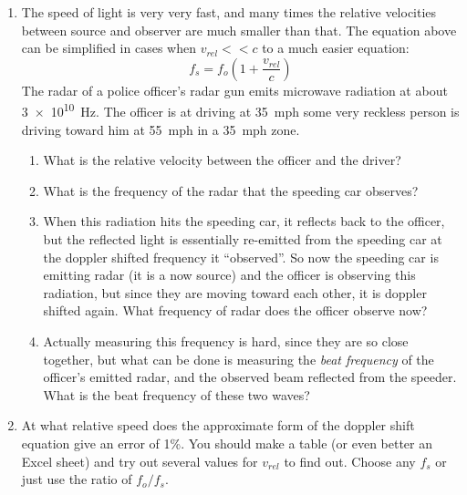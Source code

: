 \begin{enumerate}
\item
The speed of light is very very fast, and many times the relative velocities between source and observer are much smaller than that. The equation above can be simplified in cases when $v_{rel}<<c$ to a much easier equation: 
\[f_s = f_o\left(1+\frac{v_{rel}}{c}\right)\]
The radar of a police officer's radar gun emits microwave radiation at about \SI{3e10}{\hertz}. The officer is at driving at \SI{35}{mph} some very reckless person is driving toward him at \SI{55}{mph} in a \SI{35}{mph} zone. 
\begin{enumerate}
	\setlength\itemsep{2 in}
	\item What is the relative velocity between the officer and the driver?
	\item What is the frequency of the radar that the speeding car observes?
	\item When this radiation hits the speeding car, it reflects back to the officer, but the reflected light is essentially re-emitted from the speeding car at the doppler shifted frequency it ``observed''. So now the speeding car is emitting radar (it is a now source) and the officer is observing this radiation, but since they are moving toward each other, it is doppler shifted again. What frequency of radar does the officer observe now?
	\item Actually measuring this frequency is hard, since they are so close together, but what can be done is measuring the \emph{beat frequency} of the officer's emitted radar, and the observed beam reflected from the speeder. What is the beat frequency of these two waves? 
\end{enumerate} 

\item
At what relative speed does the approximate form of the doppler shift equation give an error of 1\%. You should make a table (or even better an Excel sheet) and try out several values for $v_{rel}$ to find out. Choose any $f_s$ or just use the ratio of $f_o/f_s$.

\newpage 

\ %

\newpage

\end{enumerate}